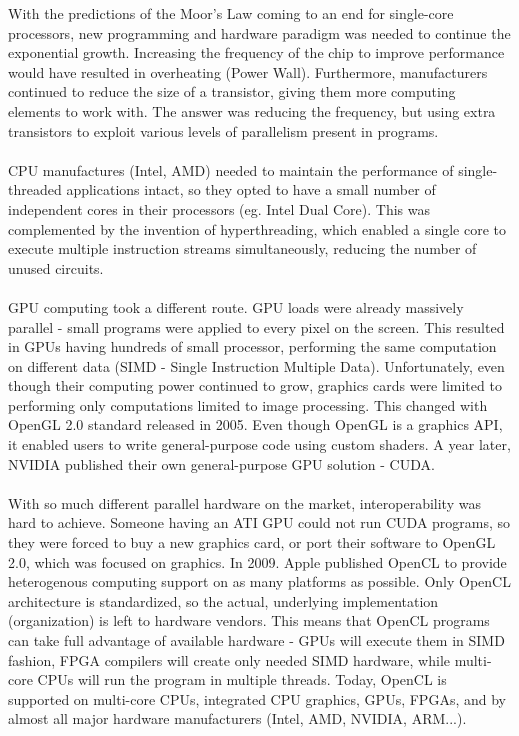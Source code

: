 With the predictions of the Moor's Law coming to an end for single-core processors, new programming and hardware paradigm was needed to continue the exponential growth. Increasing the frequency of the chip to improve performance would have resulted in overheating (Power Wall). Furthermore, manufacturers continued to reduce the size of a transistor, giving them more computing elements to work with. The answer was reducing the frequency, but using extra transistors to exploit various levels of parallelism present in programs.\\
\\
CPU manufactures (Intel, AMD) needed to maintain the performance of single-threaded applications intact, so they opted to have a small number of independent cores in their processors (eg. Intel Dual Core). This was complemented by the invention of hyperthreading, which enabled a single core to execute multiple instruction streams simultaneously, reducing the number of unused circuits.\\
\\
GPU computing took a different route. GPU loads were already massively parallel - small programs were applied to every pixel on the screen. This resulted in GPUs having hundreds of small processor, performing the same computation on different data (SIMD - Single Instruction Multiple Data). Unfortunately, even though their computing power continued to grow, graphics cards were limited to performing only computations limited to image processing. This changed with OpenGL 2.0 standard released in 2005. Even though OpenGL is a graphics API, it enabled users to write general-purpose code using custom shaders. A year later, NVIDIA published their own general-purpose GPU solution - CUDA.\\
\\
With so much different parallel hardware on the market, interoperability was hard to achieve. Someone having an ATI GPU could not run CUDA programs, so they were forced to buy a new graphics card, or port their software to OpenGL 2.0, which was focused on graphics. In 2009. Apple published OpenCL to provide heterogenous computing support on as many platforms as possible. Only OpenCL architecture is standardized, so the actual, underlying implementation (organization) is left to hardware vendors. This means that OpenCL programs can take full advantage of available hardware - GPUs will execute them in SIMD fashion, FPGA compilers will create only needed SIMD hardware, while multi-core CPUs will run the program in multiple threads. Today, OpenCL is supported on multi-core CPUs, integrated CPU graphics, GPUs, FPGAs, and by almost all major hardware manufacturers (Intel, AMD, NVIDIA, ARM...).


